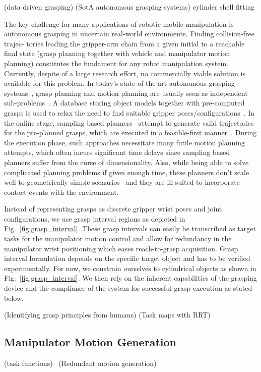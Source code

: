 \cite{Bohg14}(data driven grasping) (SotA autonomous grasping systems) \cite{Pas13} cylinder shell
fitting

The key challenge for many applications of robotic mobile manipulation is autonomous grasping in
uncertain real-world environments. Finding collision-free trajec- tories leading the gripper-arm
chain from a given initial to a reachable final state (grasp planning together with vehicle and
manipulator motion planning) constitutes the fundament for any robot manipulation system. Currently,
despite of a large research effort, no commercially viable solution is available for this
problem. In today’s state-of-the-art autonomous grasping systems~\cite{Bere07, Srin10, Krug14a},
grasp planning and motion planning are usually seen as independent sub-problems~\cite{Dian10}. A
database storing object models together with pre-computed grasps is used to relax the need to find
suitable gripper poses/configurations~\cite{Mill04, Gold11, Krug14a}. In the online stage, sampling
based planners~\cite{LaVa06} attempt to generate valid trajectories for the pre-planned grasps,
which are executed in a feasible-first manner~\cite{Bere07}. During the execution phase, such
approaches necessitate many futile motion planning attempts, which often incurs significant time
delays since sampling based planners suffer from the curse of dimensionality. Also, while being able
to solve complicated planning problems if given enough time, these planners don’t scale well to
geometrically simple scenarios~\cite{Ratl09} and they are ill suited to incorporate contact events
with the environment.

 Instead of representing grasps as discrete gripper wrist poses and joint
configurations, we use grasp interval regions as depicted in Fig.~\ref{fig:grasp_interval}. These
grasp intervals can easily be transcribed as target tasks for the manipulator motion control and
allow for redundancy in the manipulator wrist positioning which eases reach-to-grasp
acquisition. Grasp interval formulation depends on the specific target object and has to be verified
experimentally. For now, we constrain ourselves to cylindrical objects as shown in
Fig.~\ref{fig:grasp_interval}. We then rely on the inherent capabilities of the grasping device and
the compliance of the system for successful grasp execution as stated below.


\cite{Bala12}(Identifying grasp principles from humans) \cite{Gien08a, Gien08b, Vahr10}(Task maps with RRT)
%
\subsection{Manipulator Motion Generation}
\label{subsec:manip_motion}
%
 \cite{Sams91}(task functions)
~\cite{Sici91, Sent10}(Redundant motion generation)

